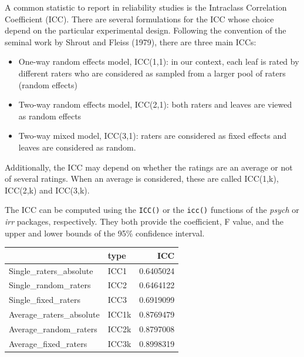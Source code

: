 \documentclass[
  letterpaper,
  DIV=11,
  numbers=noendperiod]{scrreprt}
\newenvironment{Shaded}{\begin{snugshade}}{\end{snugshade}}
\newcommand{\CommentTok}[1]{\textcolor[rgb]{0.37,0.37,0.37}{#1}}
\newcommand{\DecValTok}[1]{\textcolor[rgb]{0.68,0.00,0.00}{#1}}
\newcommand{\FunctionTok}[1]{\textcolor[rgb]{0.28,0.35,0.67}{#1}}
\newcommand{\NormalTok}[1]{\textcolor[rgb]{0.00,0.23,0.31}{#1}}
\newcommand{\OtherTok}[1]{\textcolor[rgb]{0.00,0.23,0.31}{#1}}
\newcommand{\SpecialCharTok}[1]{\textcolor[rgb]{0.37,0.37,0.37}{#1}}
\begin{document}
A common statistic to report in reliability studies is the Intraclass
Correlation Coefficient (ICC). There are several formulations for the
ICC whose choice depend on the particular experimental design. Following
the convention of the seminal work by Shrout and Fleiss (1979), there
are three main ICCs:

\begin{itemize}
\item
  One-way random effects model, ICC(1,1): in our context, each leaf is
  rated by different raters who are considered as sampled from a larger
  pool of raters (random effects)
\item
  Two-way random effects model, ICC(2,1): both raters and leaves are
  viewed as random effects
\item
  Two-way mixed model, ICC(3,1): raters are considered as fixed effects
  and leaves are considered as random.
\end{itemize}

Additionally, the ICC may depend on whether the ratings are an average
or not of several ratings. When an average is considered, these are
called ICC(1,k), ICC(2,k) and ICC(3,k).

The ICC can be computed using the \texttt{ICC()} or the \texttt{icc()}
functions of the \emph{psych} or \emph{irr} packages, respectively. They
both provide the coefficient, F value, and the upper and lower bounds of
the 95\% confidence interval.

\begin{Shaded}
\end{Shaded}

\begin{longtable}[]{@{}llr@{}}
\toprule()
& type & ICC \\
\midrule()
\endhead
Single\_raters\_absolute & ICC1 & 0.6405024 \\
Single\_random\_raters & ICC2 & 0.6464122 \\
Single\_fixed\_raters & ICC3 & 0.6919099 \\
Average\_raters\_absolute & ICC1k & 0.8769479 \\
Average\_random\_raters & ICC2k & 0.8797008 \\
Average\_fixed\_raters & ICC3k & 0.8998319 \\
\bottomrule()
\end{longtable}
\end{document}
